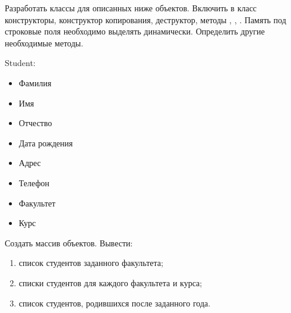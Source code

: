 
Разработать классы для описанных ниже объектов. Включить в класс
конструкторы, конструктор копирования, деструктор, методы ,
, . Память под строковые поля необходимо выделять
динамически. Определить другие необходимые методы.

Student:
\begin{itemize}
	\item Фамилия
	\item Имя
	\item Отчество
	\item Дата рождения
	\item Адрес
	\item Телефон
	\item Факультет
	\item Курс
\end{itemize}

Создать массив объектов. Вывести:
\begin{enumerate}
	\item список студентов заданного факультета;
	\item списки студентов для каждого факультета и курса;
	\item список студентов, родившихся после заданного года.
\end{enumerate}
